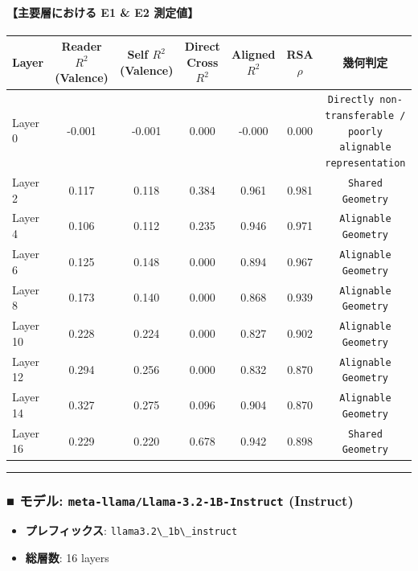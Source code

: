 \paragraph{【主要層における E1 \& E2 測定値】}
\begin{center}
\small
\begin{tabular}{lcccccc}
\toprule
\textbf{Layer} & \textbf{Reader $R^2$ (Valence)} & \textbf{Self $R^2$ (Valence)} & \textbf{Direct Cross $R^2$} & \textbf{Aligned $R^2$} & \textbf{RSA $\rho$} & \textbf{幾何判定} \\
\midrule
Layer  0 & -0.001 & -0.001 & 0.000 & -0.000 & 0.000 & \texttt{Directly non-transferable / poorly alignable representation} \\
Layer  2 & 0.117 & 0.118 & 0.384 & 0.961 & 0.981 & \texttt{Shared Geometry} \\
Layer  4 & 0.106 & 0.112 & 0.235 & 0.946 & 0.971 & \texttt{Alignable Geometry} \\
Layer  6 & 0.125 & 0.148 & 0.000 & 0.894 & 0.967 & \texttt{Alignable Geometry} \\
Layer  8 & 0.173 & 0.140 & 0.000 & 0.868 & 0.939 & \texttt{Alignable Geometry} \\
Layer 10 & 0.228 & 0.224 & 0.000 & 0.827 & 0.902 & \texttt{Alignable Geometry} \\
Layer 12 & 0.294 & 0.256 & 0.000 & 0.832 & 0.870 & \texttt{Alignable Geometry} \\
Layer 14 & 0.327 & 0.275 & 0.096 & 0.904 & 0.870 & \texttt{Alignable Geometry} \\
Layer 16 & 0.229 & 0.220 & 0.678 & 0.942 & 0.898 & \texttt{Shared Geometry} \\
\bottomrule
\end{tabular}
\end{center}



\vspace{0.5em}\hrule\vspace{0.5em}

\subsubsection{■ モデル: \texttt{meta-llama/Llama-3.2-1B-Instruct} (Instruct)}
\begin{itemize}
\item \textbf{プレフィックス}: \texttt{llama3.2\textbackslash{}\_1b\textbackslash{}\_instruct}
\item \textbf{総層数}: 16 layers
\end{itemize}

